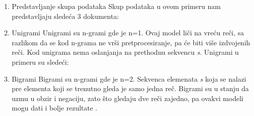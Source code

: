 \documentclass[12pt,oneside]{memoir}
\begin{document}
\begin{enumerate}
\item Predstavljanje skupa podataka
\newline
Skup podataka u ovom primeru nam predstavljaju sledeća 3 dokumenta:
\newline
\newline
\noindent{}
\newline
\newline
\item Unigrami
\newline
Unigrami su n-grami gde je n=1. Ovaj model liči na vreću reči, sa razlikom da se kod n-grama ne vrši pretprocesiranje,  pa će biti više izdvojenih reči.  Kod unigrama nema oslanjanja na prethodnu sekvencu \textit{s}. 
Unigrami u primeru su sledeći:
\newline
\newline
\noindent{}
\newline
\newline
\item Bigrami
\newline
Bigrami su n-grami gde je n=2.  Sekvenca elemenata \textit{s} koja se nalazi pre elementa koji se trenutno gleda je samo jedna reč.  Bigrami su u stanju da uzmu u obzir i negaciju, zato što gledaju dve reči zajedno, pa ovakvi modeli mogu dati i bolje rezultate \cite{ngram}.
   

\end{enumerate}
\end{document}
